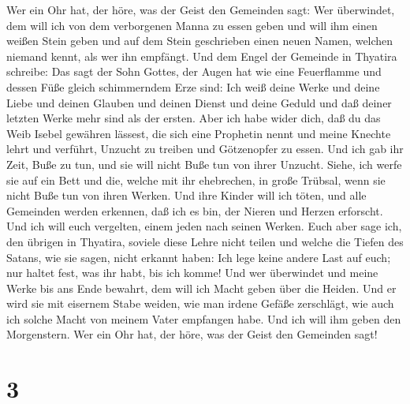  Wer ein Ohr hat, der höre, was der Geist den Gemeinden
sagt: Wer überwindet, dem will ich von dem verborgenen Manna zu essen
geben und will ihm einen weißen Stein geben und auf dem Stein
geschrieben einen neuen Namen, welchen niemand kennt, als wer ihn
empfängt.  Und dem Engel der Gemeinde in Thyatira
schreibe: Das sagt der Sohn Gottes, der Augen hat wie eine Feuerflamme
und dessen Füße gleich schimmerndem Erze sind:  Ich weiß
deine Werke und deine Liebe und deinen Glauben und deinen Dienst und
deine Geduld und daß deiner letzten Werke mehr sind als der ersten.
 Aber ich habe wider dich, daß du das Weib Isebel
gewähren lässest, die sich eine Prophetin nennt und meine Knechte lehrt
und verführt, Unzucht zu treiben und Götzenopfer zu essen.
 Und ich gab ihr Zeit, Buße zu tun, und sie will nicht
Buße tun von ihrer Unzucht.  Siehe, ich werfe sie auf ein
Bett und die, welche mit ihr ehebrechen, in große Trübsal, wenn sie
nicht Buße tun von ihren Werken.  Und ihre Kinder will
ich töten, und alle Gemeinden werden erkennen, daß ich es bin, der
Nieren und Herzen erforscht. Und ich will euch vergelten, einem jeden
nach seinen Werken.  Euch aber sage ich, den übrigen in
Thyatira, soviele diese Lehre nicht teilen und welche die Tiefen des
Satans, wie sie sagen, nicht erkannt haben: Ich lege keine andere Last
auf euch;  nur haltet fest, was ihr habt, bis ich komme!
 Und wer überwindet und meine Werke bis ans Ende bewahrt,
dem will ich Macht geben über die Heiden.  Und er wird
sie mit eisernem Stabe weiden, wie man irdene Gefäße zerschlägt, wie
auch ich solche Macht von meinem Vater empfangen habe. 
Und ich will ihm geben den Morgenstern.  Wer ein Ohr hat,
der höre, was der Geist den Gemeinden sagt!

\hypertarget{section-2}{%
\section{3}\label{section-2}}

